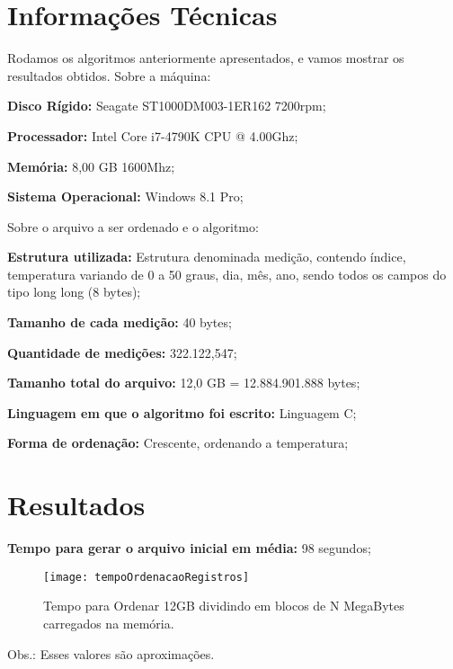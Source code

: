 \setcounter{chapter}{+2}

\section{Informações Técnicas}
Rodamos os algoritmos anteriormente apresentados, e vamos mostrar os resultados obtidos. Sobre a máquina:
\newline

\textbf{Disco Rígido:} Seagate ST1000DM003-1ER162 7200rpm;
\par
\textbf{Processador:} Intel Core i7-4790K CPU @ 4.00Ghz;
\par
\textbf{Memória:} 8,00 GB 1600Mhz;
\par
\textbf{Sistema Operacional:} Windows 8.1 Pro;
\newline

Sobre o arquivo a ser ordenado e o algoritmo:
\par
\textbf{Estrutura utilizada:} Estrutura denominada medição, contendo índice, temperatura variando de 0 a 50 graus, dia, mês, ano, sendo todos os campos do tipo long long (8 bytes);
\par
\textbf{Tamanho de cada medição:} 40 bytes; 
\par
 
\textbf{Quantidade de medições:} 322.122,547;
\par

\textbf{Tamanho total do arquivo:} 12,0 GB = 12.884.901.888 bytes;
\par
\textbf{Linguagem em que o algoritmo foi escrito:} Linguagem C;
\par
\textbf{Forma de ordenação:} Crescente, ordenando a temperatura;
\newpage

\section{Resultados}

\textbf{Tempo para gerar o arquivo inicial em média:} 98 segundos;
\par

\begin{figure}[h]
\texttt{[image: tempoOrdenacaoRegistros]}
\caption{Tempo para Ordenar 12GB dividindo em blocos de N MegaBytes carregados na memória.}
\label{fig:tempoOrdenacaoRegistros}
\end{figure}
Obs.: Esses valores são aproximações.


